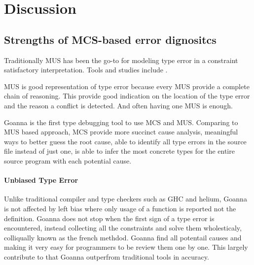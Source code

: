 \documentclass[pdflatex,sn-mathphys-num]{sn-jnl}%
\begin{document}
  
        


    \section{Discussion} \label{sec:discussion}
    

    \subsection{Strengths of MCS-based error dignositcs}
    Traditionally MUS has been the go-to for modeling type error in a constraint satisfactory interpretation. Tools and studies include .

    MUS is good representation of type error because every MUS provide a complete chain of reasoning. This provide good indication on the location of the type error and the reason a conflict is detected. And often having one MUS is enough.

    Goanna is the first type debugging tool to use MCS and MUS. Comparing to MUS based approach, MCS provide more succinct cause analysis, meaningful ways to better guess the root cause, able to identify all type errors in the source file instead of just one, is able to infer the most concrete types for the entire source program with each potential cause.
    
    \paragraph{Unbiased Type Error}
    Unlike traditional compiler and type checkers such as GHC and helium, Goanna is not affected by left bias where only usage of a function is reported not the definition. Goanna does not stop when the first sign of a type error is encountered, instead collecting all the constraints and solve them wholesticaly, colliqually known as the french methdod. Goanna find all potentail causes and making it very easy for programmers to be review them one by one.
    This largely contribute to that Goanna outperfrom traditional tools in accuracy.
    
\end{document}
